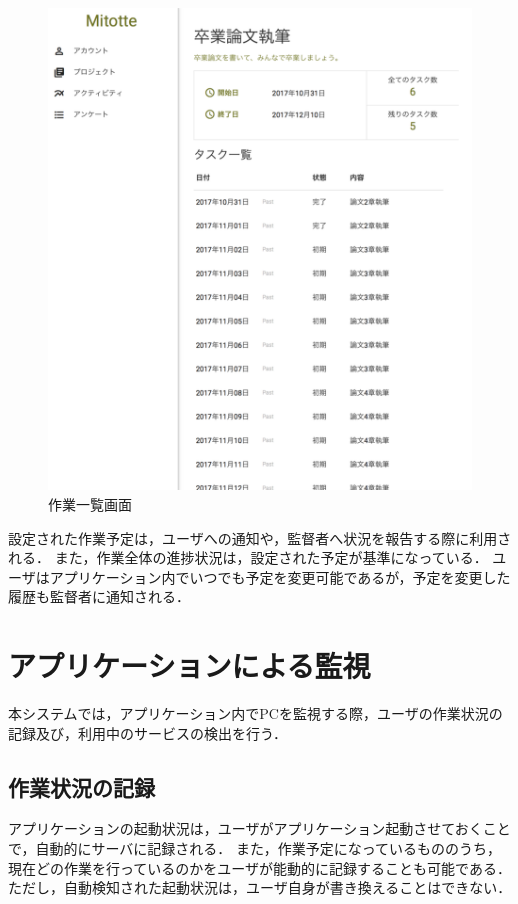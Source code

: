 \begin{figure}[h]
  \begin{center}
  \includegraphics[width=12.0cm]{graphics/mitotte02.png}
  \caption{作業一覧画面}
  \end{center}
\end{figure}

設定された作業予定は，ユーザへの通知や，監督者へ状況を報告する際に利用される．
また，作業全体の進捗状況は，設定された予定が基準になっている．
ユーザはアプリケーション内でいつでも予定を変更可能であるが，予定を変更した履歴も監督者に通知される．

\section{アプリケーションによる監視}
本システムでは，アプリケーション内でPCを監視する際，ユーザの作業状況の記録及び，利用中のサービスの検出を行う．

\subsection{作業状況の記録}
アプリケーションの起動状況は，ユーザがアプリケーション起動させておくことで，自動的にサーバに記録される．
また，作業予定になっているもののうち，現在どの作業を行っているのかをユーザが能動的に記録することも可能である．
ただし，自動検知された起動状況は，ユーザ自身が書き換えることはできない．

